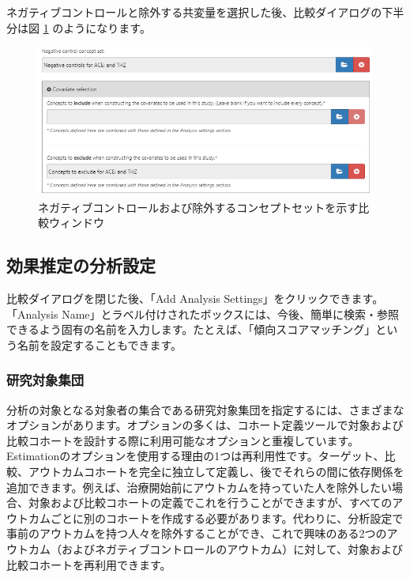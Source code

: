 \documentclass[
  11pt]{book}
\theoremstyle{definition}
\theoremstyle{definition}
\theoremstyle{definition}
\theoremstyle{definition}
\theoremstyle{remark}
\begin{document}
ネガティブコントロールと除外する共変量を選択した後、比較ダイアログの下半分は図 \ref{fig:comparisons2} のようになります。

\begin{figure}

{\centering \includegraphics[width=1\linewidth]{images/PopulationLevelEstimation/comparisons2} 

}

\caption{ネガティブコントロールおよび除外するコンセプトセットを示す比較ウィンドウ}\label{fig:comparisons2}
\end{figure}

\subsection{効果推定の分析設定}\label{ux52b9ux679cux63a8ux5b9aux306eux5206ux6790ux8a2dux5b9a}

比較ダイアログを閉じた後、「Add Analysis Settings」をクリックできます。「Analysis Name」とラベル付けされたボックスには、今後、簡単に検索・参照できるよう固有の名前を入力します。たとえば、「傾向スコアマッチング」という名前を設定することもできます。

\subsubsection*{研究対象集団}\label{ux7814ux7a76ux5bfeux8c61ux96c6ux56e3}

分析の対象となる対象者の集合である研究対象集団を指定するには、さまざまなオプションがあります。オプションの多くは、コホート定義ツールで対象および比較コホートを設計する際に利用可能なオプションと重複しています。Estimationのオプションを使用する理由の1つは再利用性です。ターゲット、比較、アウトカムコホートを完全に独立して定義し、後でそれらの間に依存関係を追加できます。例えば、治療開始前にアウトカムを持っていた人を除外したい場合、対象および比較コホートの定義でこれを行うことができますが、すべてのアウトカムごとに別のコホートを作成する必要があります。代わりに、分析設定で事前のアウトカムを持つ人々を除外することができ、これで興味のある2つのアウトカム（およびネガティブコントロールのアウトカム）に対して、対象および比較コホートを再利用できます。
\end{document}
